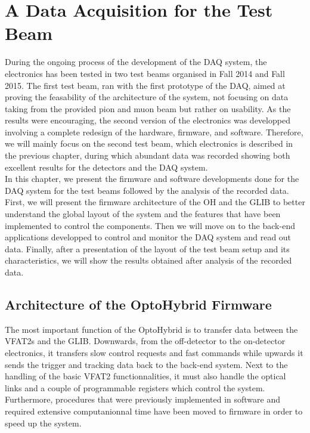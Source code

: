 \chapter{A Data Acquisition for the Test Beam}
\label{chap:II-3-test-beam}

  During the ongoing process of the development of the DAQ system, the electronics has been tested in two test beams organised in Fall 2014 and Fall 2015. The first test beam, ran with the first prototype of the DAQ, aimed at proving the feasability of the architecture of the system, not focusing on data taking from the provided pion and muon beam but rather on usability. As the results were encouraging, the second version of the electronics was developped involving a complete redesign of the hardware, firmware, and software. Therefore, we will mainly focus on the second test beam, which electronics is described in the previous chapter, during which abundant data was recorded showing both excellent results for the detectors and the DAQ system. \\

  In this chapter, we present the firmware and software developments done for the DAQ system for the test beams followed by the analysis of the recorded data. First, we will present the firmware architecture of the OH and the GLIB to better understand the global layout of the system and the features that have been implemented to control the components. Then we will move on to the back-end applications developped to control and monitor the DAQ system and read out data. Finally, after a presentation of the layout of the test beam setup and its characteristics, we will show the results obtained after analysis of the recorded data.

  \section{Architecture of the OptoHybrid Firmware}

    The most important function of the OptoHybrid is to transfer data between the VFAT2s and the GLIB. Downwards, from the off-detector to the on-detector electronics, it transfers slow control requests and fast commands while upwards it sends the trigger and tracking data back to the back-end system. Next to the handling of the basic VFAT2 functionnalities, it must also handle the optical links and a couple of programmable registers which control the system. Furthermore, procedures that were previously implemented in software and required extensive computanionnal time have been moved to firmware in order to speed up the system. \\

